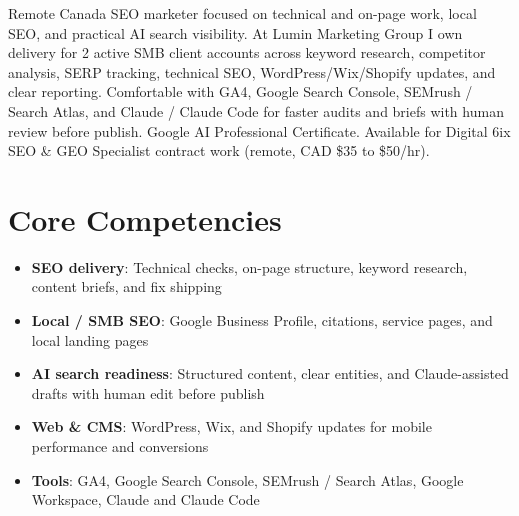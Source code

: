 \documentclass[11pt,a4paper,sans]{moderncv}
\begin{document}
\makecvtitle

\vspace{6pt}
\small{Remote Canada SEO marketer focused on technical and on-page work, local SEO, and practical AI search visibility. At Lumin Marketing Group I own delivery for 2 active SMB client accounts across keyword research, competitor analysis, SERP tracking, technical SEO, WordPress/Wix/Shopify updates, and clear reporting. Comfortable with GA4, Google Search Console, SEMrush / Search Atlas, and Claude / Claude Code for faster audits and briefs with human review before publish. Google AI Professional Certificate. Available for Digital 6ix SEO \& GEO Specialist contract work (remote, CAD \$35 to \$50/hr).}

\section{Core Competencies}
\vspace{1pt}
\begin{itemize}
\item \textbf{SEO delivery}: Technical checks, on-page structure, keyword research, content briefs, and fix shipping
\item \textbf{Local / SMB SEO}: Google Business Profile, citations, service pages, and local landing pages
\item \textbf{AI search readiness}: Structured content, clear entities, and Claude-assisted drafts with human edit before publish
\item \textbf{Web \& CMS}: WordPress, Wix, and Shopify updates for mobile performance and conversions
\item \textbf{Tools}: GA4, Google Search Console, SEMrush / Search Atlas, Google Workspace, Claude and Claude Code
\end{itemize}
\end{document}
